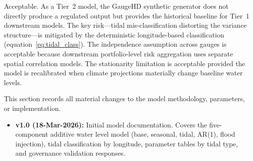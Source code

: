 \documentclass[11pt,a4paper]{article}
\begin{document}
Acceptable. As a Tier~2 model, the GaugeHD synthetic generator does not directly produce a regulated output but provides the historical baseline for Tier~1 downstream models. The key risk---tidal mis-classification distorting the variance structure---is mitigated by the deterministic longitude-based classification (equation~\ref{eq:tidal_class}). The independence assumption across gauges is acceptable because downstream portfolio-level risk aggregation uses separate spatial correlation models. The stationarity limitation is acceptable provided the model is recalibrated when climate projections materially change baseline water levels.

\clearpage

\mkmchangelog

This section records all material changes to the model methodology, parameters,
or implementation.

\begin{itemize}[nosep]
    \item \textbf{v1.0 (18-Mar-2026):} Initial model documentation. Covers the
          five-component additive water level model (base, seasonal, tidal, AR(1),
          flood injection), tidal classification by longitude, parameter tables by
          tidal type, and governance validation responses.
\end{itemize}

\end{document}

